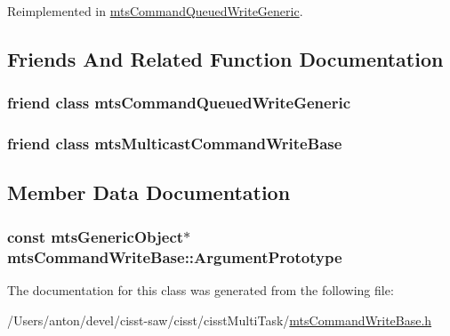 Reimplemented in \hyperlink{classmts_command_queued_write_generic_a49574e06b777c7122675adb3022993ef}{mts\+Command\+Queued\+Write\+Generic}.



\subsection{Friends And Related Function Documentation}
\hypertarget{classmts_command_write_base_aebd3531dc414cbd5c5aff710ecbfac4f}{}
\subsubsection[{mts\+Command\+Queued\+Write\+Generic}]{\setlength{\rightskip}{0pt plus 5cm}friend class {\bf mts\+Command\+Queued\+Write\+Generic}\hspace{0.3cm}{\ttfamily [friend]}}\label{classmts_command_write_base_aebd3531dc414cbd5c5aff710ecbfac4f}
\hypertarget{classmts_command_write_base_a01bea616c1ae77f302ccedbbc1300c12}{}
\subsubsection[{mts\+Multicast\+Command\+Write\+Base}]{\setlength{\rightskip}{0pt plus 5cm}friend class {\bf mts\+Multicast\+Command\+Write\+Base}\hspace{0.3cm}{\ttfamily [friend]}}\label{classmts_command_write_base_a01bea616c1ae77f302ccedbbc1300c12}


\subsection{Member Data Documentation}
\hypertarget{classmts_command_write_base_a92e316a7f32f52a18b47a02867b104d2}{}
\subsubsection[{Argument\+Prototype}]{\setlength{\rightskip}{0pt plus 5cm}const {\bf mts\+Generic\+Object}$\ast$ mts\+Command\+Write\+Base\+::\+Argument\+Prototype\hspace{0.3cm}{\ttfamily [protected]}}\label{classmts_command_write_base_a92e316a7f32f52a18b47a02867b104d2}


The documentation for this class was generated from the following file\+:\begin{DoxyCompactItemize}
\item 
/\+Users/anton/devel/cisst-\/saw/cisst/cisst\+Multi\+Task/\hyperlink{mts_command_write_base_8h}{mts\+Command\+Write\+Base.\+h}\end{DoxyCompactItemize}
